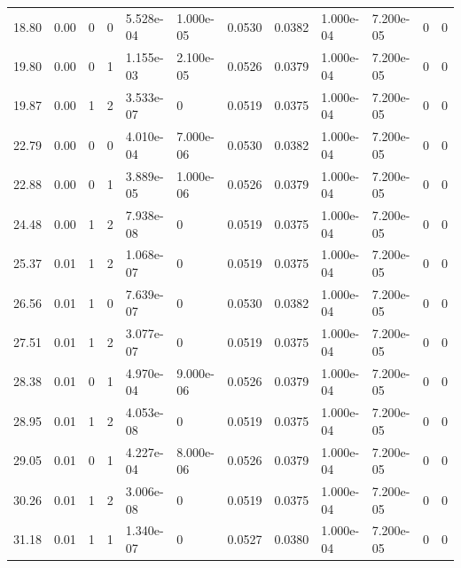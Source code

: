 \documentclass[preview]{standalone}
\begin{document}
{{\begin{tabular}{L{1.2cm}C{1.2cm} C{0.3cm}C{0.5cm} C{1.4cm}C{1.4cm} C{1.4cm}C{1.4cm} C{1.6cm}C{1.6cm} C{1.6cm}C{1.6cm}}
  18.80  &  0.00  & 0     &  0 &  5.528e-04  & 1.000e-05  &  0.0530&   0.0382& 1.000e-04 & 7.200e-05   &  0 & 0  \\ 
  19.80  &  0.00  & 0     &  1 &  1.155e-03  & 2.100e-05  &  0.0526&   0.0379& 1.000e-04 & 7.200e-05   &  0 & 0  \\ 
  19.87  &  0.00  & 1     &  2 &  3.533e-07  & 0  &  0.0519&   0.0375& 1.000e-04 & 7.200e-05   &  0 & 0  \\ 
  22.79  &  0.00  & 0     &  0 &  4.010e-04  & 7.000e-06  &  0.0530&   0.0382& 1.000e-04 & 7.200e-05   &  0 & 0  \\ 
  22.88  &  0.00  & 0     &  1 &  3.889e-05  & 1.000e-06  &  0.0526&   0.0379& 1.000e-04 & 7.200e-05   &  0 & 0  \\ 
  24.48  &  0.00  & 1     &  2 &  7.938e-08  & 0  &  0.0519&   0.0375& 1.000e-04 & 7.200e-05   &  0 & 0  \\ 
  25.37  &  0.01  & 1     &  2 &  1.068e-07  & 0  &  0.0519&   0.0375& 1.000e-04 & 7.200e-05   &  0 & 0  \\ 
  26.56  &  0.01  & 1     &  0 &  7.639e-07  & 0  &  0.0530&   0.0382& 1.000e-04 & 7.200e-05   &  0 & 0  \\ 
  27.51  &  0.01  & 1     &  2 &  3.077e-07  & 0  &  0.0519&   0.0375& 1.000e-04 & 7.200e-05   &  0 & 0  \\ 
  28.38  &  0.01  & 0     &  1 &  4.970e-04  & 9.000e-06  &  0.0526&   0.0379& 1.000e-04 & 7.200e-05   &  0 & 0  \\ 
  28.95  &  0.01  & 1     &  2 &  4.053e-08  & 0  &  0.0519&   0.0375& 1.000e-04 & 7.200e-05   &  0 & 0  \\ 
  29.05  &  0.01  & 0     &  1 &  4.227e-04  & 8.000e-06  &  0.0526&   0.0379& 1.000e-04 & 7.200e-05   &  0 & 0  \\ 
  30.26  &  0.01  & 1     &  2 &  3.006e-08  & 0  &  0.0519&   0.0375& 1.000e-04 & 7.200e-05   &  0 & 0  \\ 
  31.18  &  0.01  & 1     &  1 &  1.340e-07  & 0  &  0.0527&   0.0380& 1.000e-04 & 7.200e-05   &  0 & 0  \\ 
\hline 
\end{tabular} 

}}
\end{document}

